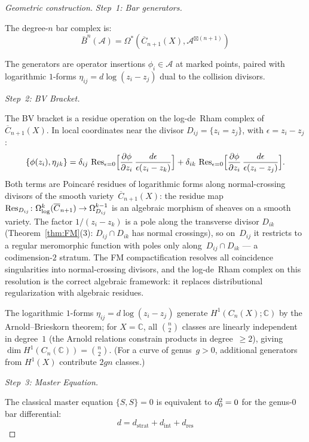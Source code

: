\begin{proof}[Geometric construction]
\emph{Step~1: Bar generators.}

The degree-$n$ bar complex is:
\[\bar{B}^n(\mathcal{A}) = \Omega^*(\overline{C}_{n+1}(X), \mathcal{A}^{\boxtimes (n+1)})\]

The generators are operator insertions $\phi_i \in \mathcal{A}$ at marked points, paired with logarithmic $1$-forms $\eta_{ij} = d\log(z_i - z_j)$ dual to the collision divisors.

\emph{Step~2: BV Bracket.}

The BV bracket is a residue operation on the log-de~Rham complex
of~$\overline{C}_{n+1}(X)$.  In local coordinates near the divisor
$D_{ij} = \{z_i = z_j\}$, with $\epsilon = z_i - z_j$:
\[\{\phi(z_i), \eta_{jk}\}
= \delta_{ij}\,\operatorname{Res}_{\epsilon = 0}
\Bigl[\frac{\partial\phi}{\partial z_i}\,
\frac{d\epsilon}{\epsilon(z_i - z_k)}\Bigr]
+ \delta_{ik}\,\operatorname{Res}_{\epsilon = 0}
\Bigl[\frac{\partial\phi}{\partial z_i}\,
\frac{d\epsilon}{\epsilon(z_i - z_j)}\Bigr].\]
Both terms are Poincar\'e residues of logarithmic forms along
normal-crossing divisors of the smooth
variety~$\overline{C}_{n+1}(X)$: the residue map
$\operatorname{Res}_{D_{ij}}\colon \Omega^k_{\log}(\overline{C}_{n+1})
\to \Omega^{k-1}_{D_{ij}}$ is an algebraic morphism of sheaves
on a smooth variety.  The factor $1/(z_i - z_k)$ is a pole along
the transverse divisor $D_{ik}$ (Theorem~\ref{thm:FM}(3):
$D_{ij} \cap D_{ik}$ has normal crossings), so on~$D_{ij}$
it restricts to a regular meromorphic function with poles only
along~$D_{ij} \cap D_{ik}$ --- a codimension-$2$ stratum.
The FM compactification resolves all coincidence singularities
into normal-crossing divisors, and the log-de~Rham complex on
this resolution is the correct algebraic framework: it replaces
distributional regularization with algebraic residues.

The logarithmic $1$-forms $\eta_{ij} = d\log(z_i - z_j)$ generate
$H^1(C_n(X); \mathbb{C})$ by the Arnold--Brieskorn theorem;
for $X = \mathbb{C}$, all $\binom{n}{2}$ classes are linearly independent in degree~$1$
(the Arnold relations constrain products in degree~$\geq 2$), giving
$\dim H^1(C_n(\mathbb{C})) = \binom{n}{2}$.  (For a curve of genus~$g > 0$, additional generators from $H^1(X)$ contribute $2gn$ classes.)

\emph{Step~3: Master Equation.}

The classical master equation $\{S, S\} = 0$ is equivalent to $d_0^2 = 0$ for the
genus-$0$ bar differential:
\[d = d_{\text{strat}} + d_{\text{int}} + d_{\text{res}}\]
\end{proof}

